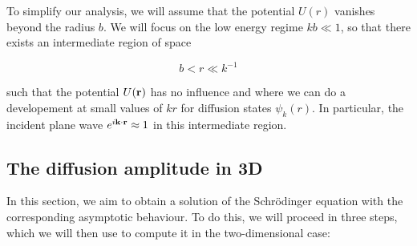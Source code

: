 To simplify our analysis, we will assume that the potential $U(r)$ vanishes beyond the radius $b$. We will focus on the low energy regime $kb\ll 1$, so that there exists an intermediate region of space

\begin{equation}
    b<r\ll k^{-1}
\end{equation}

such that the potential $U(\vb r)$ has no influence and where we can do a developement at small values of $kr$ for diffusion states $\psi_k(r)$. In particular, the incident plane wave $e^{i\vb k\cdot \vb r} \approx 1$ in this intermediate region.

\subsection{The diffusion amplitude in 3D}

In this section, we aim to obtain a solution of the Schrödinger equation with the corresponding asymptotic behaviour. To do this, we will proceed in three steps, which we will then use to compute it in the two-dimensional case:

